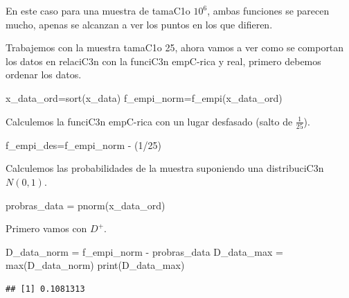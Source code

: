 \documentclass[
]{article}
\newenvironment{Shaded}{\begin{snugshade}}{\end{snugshade}}
\newcommand{\DecValTok}[1]{\textcolor[rgb]{0.00,0.00,0.81}{#1}}
\newcommand{\FunctionTok}[1]{\textcolor[rgb]{0.00,0.00,0.00}{#1}}
\newcommand{\NormalTok}[1]{#1}
\newcommand{\OtherTok}[1]{\textcolor[rgb]{0.56,0.35,0.01}{#1}}
\newcommand{\SpecialCharTok}[1]{\textcolor[rgb]{0.00,0.00,0.00}{#1}}
\begin{document}
En este caso para una muestra de tamaC1o \(10^6\), ambas funciones se
parecen mucho, apenas se alcanzan a ver los puntos en los que difieren.

Trabajemos con la muestra tamaC1o 25, ahora vamos a ver como se
comportan los datos en relaciC3n con la funciC3n empC-rica y real,
primero debemos ordenar los datos.

\begin{Shaded}
\begin{Highlighting}[]
\NormalTok{x\_data\_ord}\OtherTok{=}\FunctionTok{sort}\NormalTok{(x\_data)}
\NormalTok{f\_empi\_norm}\OtherTok{=}\FunctionTok{f\_empi}\NormalTok{(x\_data\_ord)}
\end{Highlighting}
\end{Shaded}

Calculemos la funciC3n empC-rica con un lugar desfasado (salto de
\(\frac{1}{25}\)).

\begin{Shaded}
\begin{Highlighting}[]
\NormalTok{f\_empi\_des}\OtherTok{=}\NormalTok{f\_empi\_norm }\SpecialCharTok{{-}}\NormalTok{ (}\DecValTok{1}\SpecialCharTok{/}\DecValTok{25}\NormalTok{)}
\end{Highlighting}
\end{Shaded}

Calculemos las probabilidades de la muestra suponiendo una distribuciC3n
\(N(0,1)\).

\begin{Shaded}
\begin{Highlighting}[]
\NormalTok{probras\_data }\OtherTok{=} \FunctionTok{pnorm}\NormalTok{(x\_data\_ord)}
\end{Highlighting}
\end{Shaded}

Primero vamos con \(D^{+}\).

\begin{Shaded}
\begin{Highlighting}[]
\NormalTok{D\_data\_norm }\OtherTok{=}\NormalTok{ f\_empi\_norm }\SpecialCharTok{{-}}\NormalTok{ probras\_data}
\NormalTok{D\_data\_max }\OtherTok{=} \FunctionTok{max}\NormalTok{(D\_data\_norm)}
\FunctionTok{print}\NormalTok{(D\_data\_max)}
\end{Highlighting}
\end{Shaded}

\begin{verbatim}
## [1] 0.1081313
\end{verbatim}
\end{document}
